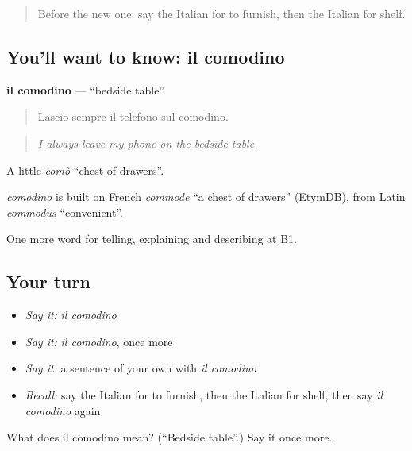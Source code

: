\label{lesson:IT-C536-comodino}



\begin{quote}
Before the new one: say the Italian for to furnish, then the Italian for shelf.
\end{quote}

\subsection*{You'll want to know: il comodino}
\textbf{il comodino} — \textquotedblleft{}bedside table\textquotedblright{}.

\begin{quote}
Lascio sempre il telefono sul comodino.
\end{quote}

\begin{quote}
\emph{I always leave my phone on the bedside table.}
\end{quote}

A little \emph{comò} \textquotedblleft{}chest of drawers\textquotedblright{}.

\begin{cousinweb}
\emph{comodino} is built on French \emph{commode} \textquotedblleft{}a chest of drawers\textquotedblright{} (EtymDB), from Latin \emph{commodus} \textquotedblleft{}convenient\textquotedblright{}.
\end{cousinweb}

\begin{grammarlens}[title={What you've built}]
One more word for telling, explaining and describing at B1.
\end{grammarlens}

\subsection*{Your turn}
\begin{itemize}
\raggedright
  \item \emph{Say it:} \emph{il comodino}
  \item \emph{Say it:} \emph{il comodino}, once more
  \item \emph{Say it:} a sentence of your own with \emph{il comodino}
  \item \emph{Recall:} say the Italian for to furnish, then the Italian for shelf, then say \emph{il comodino} again
\end{itemize}

\begin{tcolorbox}[breakable,colback=teal!4,colframe=teal!35!black,title={Before you move on}]
What does il comodino mean? (\textquotedblleft{}Bedside table\textquotedblright{}.) Say it once more.
\end{tcolorbox}
